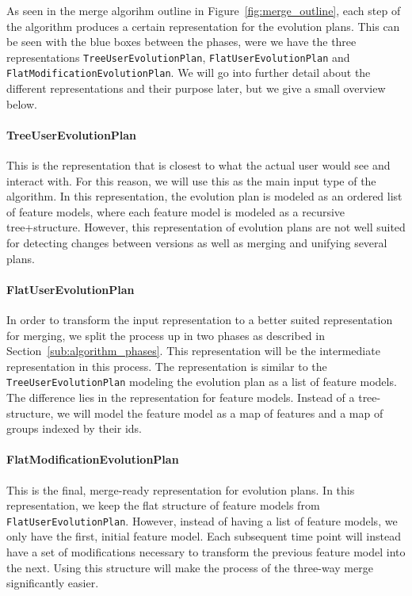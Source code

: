 \documentclass[a4paper,english]{ifimaster}
\begin{document}
As seen in the merge algorihm outline in Figure~\ref{fig:merge_outline}, each step of the algorithm produces a certain representation for the evolution plans. This can be seen with the blue boxes between the phases, were we have the three representations \texttt{TreeUserEvolutionPlan}, \texttt{FlatUserEvolutionPlan} and \texttt{FlatModificationEvolutionPlan}. We will go into further detail about the different representations and their purpose later, but we give a small overview below.

\paragraph{TreeUserEvolutionPlan}%
\label{par:treeuserevolutionplan}

This is the representation that is closest to what the actual user would see and interact with. For this reason, we will use this as the main input type of the algorithm. In this representation, the evolution plan is modeled as an ordered list of feature models, where each feature model is modeled as a recursive tree+structure. However, this representation of evolution plans are not well suited for detecting changes between versions as well as merging and unifying several plans.

\paragraph{FlatUserEvolutionPlan}%
\label{par:flatuserevolutionplan}

In order to transform the input representation to a better suited representation for merging, we split the process up in two phases as described in Section~\vref{sub:algorithm_phases}. This representation will be the intermediate representation in this process. The representation is similar to the \texttt{TreeUserEvolutionPlan} modeling the evolution plan as a list of feature models. The difference lies in the representation for feature models. Instead of a tree-structure, we will model the feature model as a map of features and a map of groups indexed by their ids.

\paragraph{FlatModificationEvolutionPlan}%
\label{par:flatmodificationevolutionplan}

This is the final, merge-ready representation for evolution plans. In this representation, we keep the flat structure of feature models from \texttt{FlatUserEvolutionPlan}. However, instead of having a list of feature models, we only have the first, initial feature model. Each subsequent time point will instead have a set of modifications necessary to transform the previous feature model into the next. Using this structure will make the process of the three-way merge significantly easier.
\end{document}
